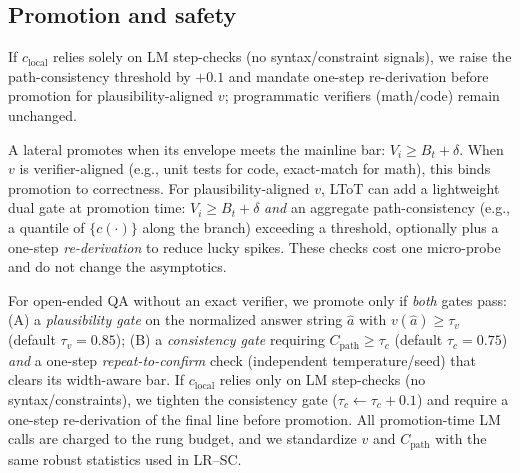 \documentclass{article}
\begin{document}
\subsection{Promotion and safety}
\label{sec:promotion}
If $c_{\text{local}}$ relies solely on LM step-checks (no syntax/constraint signals), we raise the path-consistency threshold by $+0.1$
and mandate one-step re-derivation before promotion for plausibility-aligned $v$; programmatic verifiers (math/code) remain unchanged.

A lateral promotes when its envelope meets the mainline bar: $V_i \ge B_t+\delta$.
When $v$ is verifier-aligned (e.g., unit tests for code, exact-match for math), this binds promotion to correctness.
For plausibility-aligned $v$, LToT can add a lightweight dual gate at promotion time:
$V_i\!\ge\!B_t{+}\delta$ \emph{and} an aggregate path-consistency (e.g., a quantile of $\{c(\cdot)\}$ along the branch) exceeding a threshold, optionally plus a one-step \emph{re-derivation} to reduce lucky spikes.
These checks cost one micro-probe and do not change the asymptotics.

\vspace{0.5em}
For open-ended QA without an exact verifier, we promote only if \emph{both} gates pass:
(A) a \emph{plausibility gate} on the normalized answer string $\hat a$ with $v(\hat a)\ge \tau_v$ (default $\tau_v{=}0.85$);
(B) a \emph{consistency gate} requiring $C_{\text{path}}\ge \tau_c$ (default $\tau_c{=}0.75$) \emph{and} a one-step \emph{repeat-to-confirm} check (independent temperature/seed) that clears its width-aware bar.
If $c_{\text{local}}$ relies only on LM step-checks (no syntax/constraints), we tighten the consistency gate ($\tau_c\leftarrow\tau_c{+}0.1$) and require a one-step re-derivation of the final line before promotion.
All promotion-time LM calls are charged to the rung budget, and we standardize $v$ and $C_{\text{path}}$ with the same robust statistics used in LR--SC.
\end{document}
